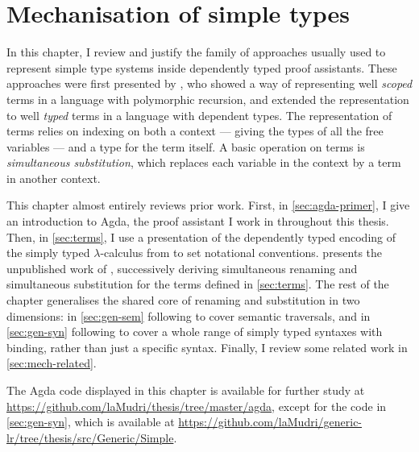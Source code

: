 \chapter{Mechanisation of simple types}\label{sec:simple}

In this chapter, I review and justify the family of approaches usually used to
represent simple type systems inside dependently typed proof assistants.
These approaches were first presented by \citet{AR99}, who showed a way of
representing well \emph{scoped} terms in a language with polymorphic recursion,
and extended the representation to well \emph{typed} terms in a language with
dependent types.
The representation of terms relies on indexing on both a context --- giving the
types of all the free variables --- and a type for the term itself.
A basic operation on terms is \emph{simultaneous substitution}, which replaces
each variable in the context by a term in another context.

This chapter almost entirely reviews prior work.
First, in \cref{sec:agda-primer}, I give an introduction to Agda, the proof
assistant I work in throughout this thesis.
Then, in \cref{sec:terms}, I use a presentation of the dependently typed
encoding of the simply typed $\lambda$-calculus from \citet{AR99} to set
notational conventions.
 presents the unpublished work of \citet{McBride05},
successively deriving simultaneous renaming and simultaneous substitution for
the terms defined in \cref{sec:terms}.
The rest of the chapter generalises the shared core of renaming and substitution
in two dimensions: in \cref{sec:gen-sem} following \citet{ACMM17} to cover
semantic traversals, and in \cref{sec:gen-syn} following \citet{AACMM21} to
cover a whole range of simply typed syntaxes with binding, rather than just
a specific syntax.
Finally, I review some related work in \cref{sec:mech-related}.

The Agda code displayed in this chapter is available for further study at
\url{https://github.com/laMudri/thesis/tree/master/agda}, except for the code
in \cref{sec:gen-syn}, which is available at
\url{https://github.com/laMudri/generic-lr/tree/thesis/src/Generic/Simple}.


